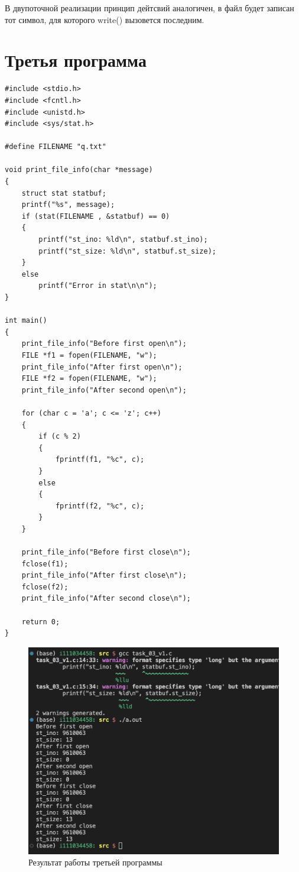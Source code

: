 В двупоточной реализации принцип дейтсвий аналогичен, в файл будет записан тот символ, для которого write() вызовется последним.

\chapter{Третья программа}

\begin{center}
\captionsetup{justification=raggedright,singlelinecheck=off}
\begin{lstlisting}[label=lst:add,caption=Третья программа]
#include <stdio.h>
#include <fcntl.h>
#include <unistd.h>
#include <sys/stat.h>

#define FILENAME "q.txt"

void print_file_info(char *message)
{
    struct stat statbuf;
    printf("%s", message);
    if (stat(FILENAME , &statbuf) == 0)
    {
        printf("st_ino: %ld\n", statbuf.st_ino);
        printf("st_size: %ld\n", statbuf.st_size);
    }
    else
        printf("Error in stat\n\n");
}

int main()
{
    print_file_info("Before first open\n");
    FILE *f1 = fopen(FILENAME, "w");
    print_file_info("After first open\n");
    FILE *f2 = fopen(FILENAME, "w");
    print_file_info("After second open\n");

    for (char c = 'a'; c <= 'z'; c++)
    {
        if (c % 2)
        {
            fprintf(f1, "%c", c);
        }
        else
        {
            fprintf(f2, "%c", c);
        }
    }

    print_file_info("Before first close\n");
    fclose(f1);
    print_file_info("After first close\n");
    fclose(f2);
    print_file_info("After second close\n");

    return 0;
}

\end{lstlisting}
\end{center}


\begin{figure}[H]
	\centering
	\includegraphics[scale=0.8]{inc/img/task_03_v1.png}
	\caption{Результат работы третьей программы}
	\label{fig:prog_03}
\end{figure}

